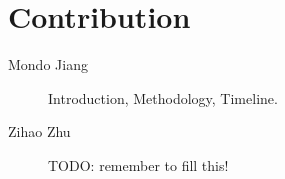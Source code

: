 \documentclass[pdftex,twocolumn,10pt,letterpaper]{article}
\begin{document}
\section*{Contribution}

\begin{description}
    \item[Mondo Jiang] Introduction, Methodology, Timeline.
    \item[Zihao Zhu] TODO: remember to fill this!
\end{description} 
{


}
\end{document}
